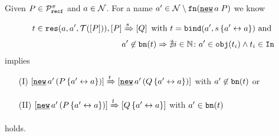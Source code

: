 \begin{lemma}
\label{lem_from_resset_to_res}
Given $P\in\mathcal P^{\pi}_{\mathtt{recf}}$ and $a\in\mathcal N$. For a name $a'\in\names\setminus\fn{\procres{a}{P}}$ we know

\begin{align*}
t\in\res{a}{a'}{P}, \ec{P}\bigstep{s}\ec{Q} \text{ with } t=\bind{a'}{s\transp{a'}{a}} \text{ and }\\
 a'\nin\bn{t}\Rightarrow\nexists{} i\in\N\colon{}a'\in\obj{t_i}\wedge{}t_i\in\inA
\end{align*}
implies
\begin{itemize}
  \item[(I)] $\ec{\procres[()]{a'}{P\transp{a'}{a}}}\bigstep{t}\ec{\procres[()]{a'}{Q\transp{a'}{a}}}$ with $a'\not\in\mathtt{bn}(t)$  or
  \item[(II)] $\ec{\procres[()]{a'}{P\transp{a'}{a}}}\bigstep{t}\ec{Q\transp{a'}{a}}$ with $a'\in\mathtt{bn}(t)$
\end{itemize}
holds.
\end{lemma}
